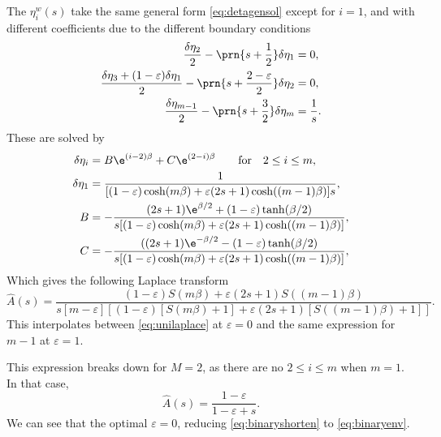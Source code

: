 \documentclass[12pt]{article}
\newcommand{\etwm}{\eta^w}
\begin{document}
The \(\etwm_i(s)\) take the same general form \eqref{eq:detagensol} except for \(i=1\), and with different coefficients due to the different boundary conditions
%
\begin{equation}\label{eq:detabndshorten}
\begin{aligned}
  \frac{\delta\eta_2}{2} - \prn{s+\frac{1}{2}}\delta\eta_1 &= 0, \\
  \frac{\delta\eta_3 + (1-\varepsilon)\delta\eta_1}{2} - \prn{s+\frac{2-\varepsilon}{2}}\delta\eta_2 &= 0, \\
  \frac{\delta\eta_{m-1}}{2} - \prn{s+\frac{3}{2}}\delta\eta_{m} &= \frac{1}{s}.
\end{aligned}
\end{equation}
%
These are solved by
%
%
\begin{equation}\label{eq:shortensol}
\begin{aligned}
  \delta\eta_i &= B\e^{(i-2)\beta} + C\e^{(2-i)\beta} \qquad
        \text{for} \quad 2 \leq i \leq m, \\
  \delta\eta_1 &= \frac{1}
         {[(1-\varepsilon)\cosh(m\beta) + \varepsilon(2s+1)\cosh((m-1)\beta)]s}, \\
  B &= - \frac{(2s+1) \e^{\beta/2} + (1-\varepsilon) \tanh(\beta/2)}
         {s [(1-\varepsilon)\cosh(m\beta) + \varepsilon(2s+1)\cosh((m-1)\beta)]}, \\
  C &= - \frac{((2s+1) \e^{-\beta/2} - (1-\varepsilon) \tanh(\beta/2)}
         {s [(1-\varepsilon)\cosh(m\beta) + \varepsilon(2s+1)\cosh((m-1)\beta)]}, \\
\end{aligned}
\end{equation}
%
Which gives the following Laplace transform
%
\begin{equation}\label{eq:shortenlaplace}
  \hat{A}(s) = \frac{(1-\varepsilon) S(m\beta) + \varepsilon(2s+1) S((m-1)\beta)}
          { s [m-\varepsilon]
            [(1-\varepsilon)[S(m\beta) + 1] + \varepsilon(2s+1)[S((m-1)\beta) + 1]] }.
\end{equation}
%
This interpolates between \eqref{eq:unilaplace} at \(\varepsilon=0\) and the same expression for \(m-1\) at \(\varepsilon=1\).

This expression breaks down for \(M = 2\), as there are no \( 2 \leq i \leq m \) when \(m = 1\).
In that case, 
%
\begin{equation}\label{eq:binaryshorten}
  \hat{A}(s) = \frac{1-\varepsilon}{1-\varepsilon + s}.
\end{equation}
%
We can see that the optimal \(\varepsilon = 0\), reducing \cref{eq:binaryshorten} to \cref{eq:binaryenv}.
\end{document}

